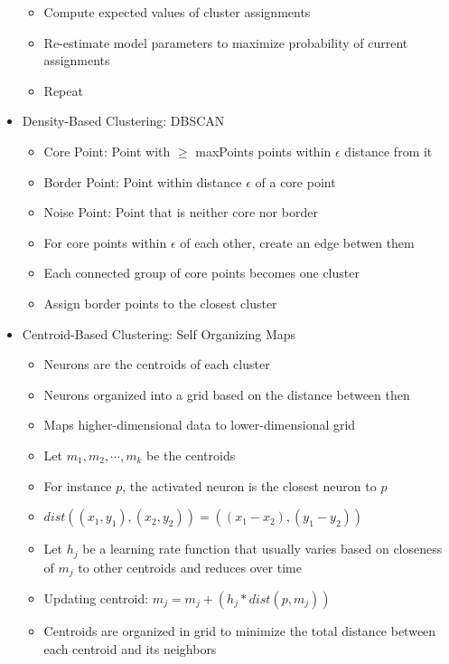 \documentclass[fontsize=4pt]{scrartcl}
\begin{document}
\begin{multicols}{3}
\begin{itemize}
		\begin{itemize}
			\item Compute expected values of cluster assignments
			\item Re-estimate model parameters to maximize probability of current assignments
			\item Repeat
		\end{itemize}
	\item Density-Based Clustering: DBSCAN
		\begin{itemize}
			\item Core Point: Point with $\geq$ maxPoints points within $\epsilon$ distance from it
			\item Border Point: Point within distance $\epsilon$ of a core point
			\item Noise Point: Point that is neither core nor border
			\item For core points within $\epsilon$ of each other, create an edge betwen them
			\item Each connected group of core points becomes one cluster
			\item Assign border points to the closest cluster
		\end{itemize}
	\item Centroid-Based Clustering: Self Organizing Maps
		\begin{itemize}
			\item Neurons are the centroids of each cluster
			\item Neurons organized into a grid based on the distance between then
			\item Maps higher-dimensional data to lower-dimensional grid
			\item Let $m_1, m_2, \cdots, m_k$ be the centroids
			\item For instance $p$, the activated neuron is the closest neuron to $p$
			\item $dist( (x_1, y_1), (x_2, y_2) ) = ( (x_1 - x_2), (y_1 - y_2) )$
			\item Let $h_j$ be a learning rate function that usually varies based on closeness of $m_j$ to other centroids and reduces over time
			\item Updating centroid: $m_j = m_j + (h_j * dist(p, m_j))$
			\item Centroids are organized in grid to minimize the total distance between each centroid and its neighbors
		\end{itemize}
\end{itemize}


\end{multicols}
\end{document}
